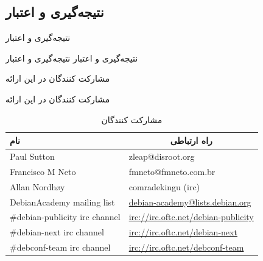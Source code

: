 \documentclass[hyperref={colorlinks}]{beamer}
\begin{document}
\begin{persian}
\section{نتیجه‌گیری و اعتبار}
\begin{frame}{نتیجه‌گیری و اعتبار}
\begin{block}{نتیجه‌گیری و اعتبار}
نتیجه‌گیری و اعتبار
\end{block}
\end{frame}
\end{persian}
\begin{persian}
\begin{frame}{مشارکت کنندگان در این ارائه}
\begin{block}{مشارکت کنندگان در این ارائه}
	\footnotesize{
		\begin{table}
			\begin{tabular}{l l l}			
				\toprule
				\textbf{نام} & \multicolumn{2}{c}{\textbf{راه ارتباطی}} \\
				\midrule
				\normalsize\raggedleft
				Paul Sutton & zleap@disroot.org &  \\
				Francisco M Neto & fmneto@fmneto.com.br & ~\\
				Allan Nordhøy & comradekingu (irc) & \\
				DebianAcademy mailing list & 
				
				\multicolumn{2}{l}{\url{debian-academy@lists.debian.org}} \\
				\#debian-publicity irc channel & \multicolumn{2}{l}{\url{irc://irc.oftc.net/debian-publicity}} \\
				\#debian-next irc channel & \multicolumn{2}{l}{\url{irc://irc.oftc.net/debian-next}} \\
				\#debconf-team irc channel & \multicolumn{2}{l}{\url{irc://irc.oftc.net/debconf-team}} \\
				\bottomrule
			\end{tabular}
			\caption{مشارکت کنندگان}
		\end{table}
	}

\end{block}
\end{frame}
\end{persian}
\end{document}
